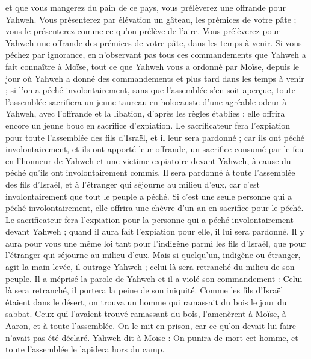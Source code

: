 \begin{multicols}{2}
et que vous mangerez du pain de ce pays, vous prélèverez une offrande pour Yahweh.
Vous présenterez par élévation un gâteau, les prémices de votre pâte ; vous le présenterez comme ce qu’on prélève de l'aire.
Vous prélèverez pour Yahweh une offrande des prémices de votre pâte, dans les temps à venir.
Si vous péchez par ignorance, en n’observant pas tous ces commandements que Yahweh a fait connaître à Moïse,
tout ce que Yahweh vous a ordonné par Moïse, depuis le jour où Yahweh a donné des commandements et plus tard dans les temps à venir ;
si l’on a péché involontairement, sans que l'assemblée s’en soit aperçue, toute l'assemblée sacrifiera un jeune taureau en holocauste d’une agréable odeur à Yahweh, avec l’offrande et la libation, d’après les règles établies ; elle offrira encore un jeune bouc en sacrifice d’expiation.
Le sacrificateur fera l’expiation pour toute l'assemblée des fils d'Israël, et il leur sera pardonné ; car ils ont péché involontairement, et ils ont apporté leur offrande, un sacrifice consumé par le feu en l’honneur de Yahweh et une victime expiatoire devant Yahweh, à cause du péché qu’ils ont involontairement commis.
Il sera pardonné à toute l'assemblée des fils d'Israël, et à l'étranger qui séjourne au milieu d’eux, car c’est involontairement que tout le peuple a péché.
Si c’est une seule personne qui a péché involontairement, elle offrira une chèvre d'un an en sacrifice pour le péché.
Le sacrificateur fera l’expiation pour la personne qui a péché involontairement devant Yahweh ; quand il aura fait l’expiation pour elle, il lui sera pardonné.
Il y aura pour vous une même loi tant pour l’indigène parmi les fils d’Israël, que pour l'étranger qui séjourne au milieu d’eux.
Mais si quelqu’un, indigène ou étranger, agit la main levée, il outrage Yahweh ; celui-là sera retranché du milieu de son peuple.
Il a méprisé la parole de Yahweh et il a violé son commandement : Celui-là sera retranché, il portera la peine de son iniquité.
Comme les fils d'Israël étaient dans le désert, on trouva un homme qui ramassait du bois le jour du sabbat.
Ceux qui l’avaient trouvé ramassant du bois, l'amenèrent à Moïse, à Aaron, et à toute l'assemblée.
On le mit en prison, car ce qu'on devait lui faire n’avait pas été déclaré.
Yahweh dit à Moïse : On punira de mort cet homme, et toute l'assemblée le lapidera hors du camp.

\end{multicols}
